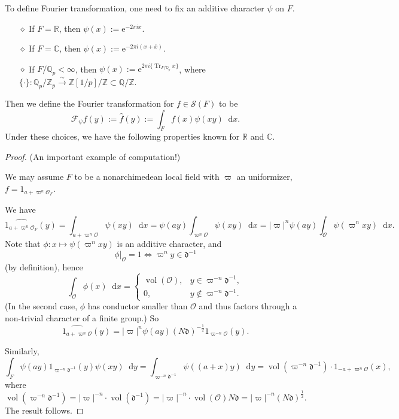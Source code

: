 \documentclass{article}
\newtheorem{theorem}{Theorem}
\theoremstyle{definition}
\theoremstyle{remark}
\renewcommand{\bar}{\overline}
\renewcommand{\hat}{\widehat}
\newcommand{\R}{\mathbb{R}}
\newcommand{\C}{\mathbb{C}}
\newcommand{\Q}{\mathbb{Q}}
\newcommand{\Z}{\mathbb{Z}}
\DeclareMathOperator{\tr}{Tr} %
\newcommand{\isomto}{\stackrel{\sim}{\rightarrow}} %
\newcommand{\dx}{\mathop{}\!\mathrm{d}x}
\newcommand{\dy}{\mathop{}\!\mathrm{d}y}
\newcommand{\diff}{\mathfrak{d}}
\renewcommand{\O}{\mathcal{O}}
\DeclareMathOperator{\vol}{vol}
\newcommand{\e}{\mathrm{e}}
\newcommand{\myit}{$\diamond$}
\begin{document}
To define Fourier transformation, one need to fix an additive character $\psi$ on $F$. 
\begin{enumerate}
    \item [\myit] If $F = \R$, then $\psi(x) := \e^{-2\pi ix}$.
    \item [\myit] If $F = \C$, then $\psi(x) := \e^{-2\pi i(x + \bar{x}) }$.
    \item [\myit] If $F/\Q_p < \infty$, then $\psi(x) := \e^{2\pi i\{\tr_{F/\Q_p}x\}}$, where $\{\cdot\}: \Q_p/\Z_p\isomto \Z[1/p]/\Z \subset \Q/\Z$.
\end{enumerate}
Then we define the Fourier transformation for $f\in\mathcal{S}(F)$ to be \[\mathcal{F}_\psi f (y) := \hat{f}(y) := \int_{F}f(x)\psi(xy)\dx.\]
Under these choices, we have the following properties known for $\R$ and $\C$.
\begin{proof}
    (An important example of computation!)

    We may assume $F$ to be a nonarchimedean local field with $\varpi$ an uniformizer, $f = 1_{a+\varpi^n\O_F}$. 

    We have \[\hat{1_{a+\varpi^n\O_F}}(y) = \int_{a+\varpi^n\O} \psi(xy)\dx = \psi(ay)\int_{\varpi^n\O}\psi(xy)\dx = |\varpi|^n\psi(ay)\int_{\O}\psi(\varpi^nxy)\dx.\]
    Note that $\phi: x\mapsto\psi(\varpi^nxy)$ is an additive character, and
    \[\phi|_{\O} = 1 \iff \varpi^ny\in\diff^{-1}\]
    (by definition), hence \[\int_\O \phi(x)\dx = \begin{cases}
        \vol(\O), &y\in \varpi^{-n}\diff^{-1},\\
        0, &y\notin\varpi^{-n}\diff^{-1}.
    \end{cases}\]
    (In the second case, $\phi$ has conductor smaller than $\O$ and thus factors through a non-trivial character of a finite group.)
    So \[\hat{1_{a+\varpi^n\O}}(y) = |\varpi|^n\psi(ay)(N\diff)^{-\frac{1}{2}}1_{\varpi^{-n}\O}(y).\]

    Similarly, \[\int_F\psi(ay)1_{\varpi^{-n}\diff^{-1}}(y)\psi(xy)\dy = \int_{\varpi^{-n}\diff^{-1}} \psi((a+x)y)\dy = \vol(\varpi^{-n}\diff^{-1})\cdot 1_{-a + \varpi^n\O}(x),\]
    where \[\vol(\varpi^{-n}\diff^{-1}) = |\varpi|^{-n}\cdot\vol(\diff^{-1}) = |\varpi|^{-n}\cdot \vol(\O)N\diff = |\varpi|^{-n}(N\diff)^{\frac{1}{2}}.\]
    The result follows.
\end{proof}
\end{document}
